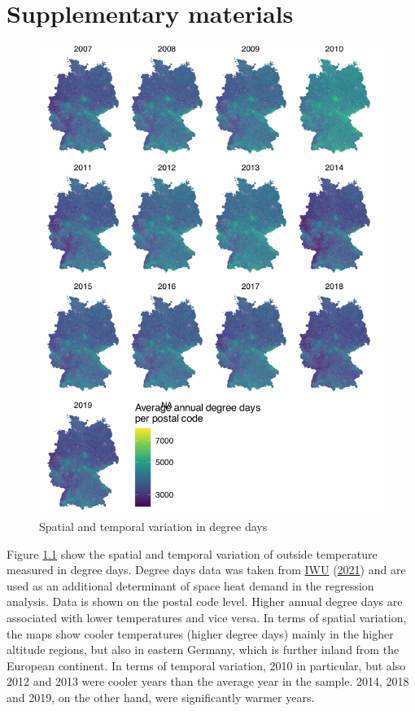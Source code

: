 \documentclass[12pt,twoside]{reedthesis}
\begin{document}
\appendix

\hypertarget{supplementary-materials}{%
\chapter{Supplementary materials}\label{supplementary-materials}}

\singlespacing
\newpage
\begin{figure}

{\centering \includegraphics[width=0.77\linewidth]{figure/distribution_degree_days} 

}

\caption{Spatial and temporal variation in degree days}\label{fig:degree-days-distribution}
\end{figure}
\noindent
Figure \ref{fig:degree-days-distribution} show the spatial and temporal variation of outside temperature measured in degree days. Degree days data was taken from \protect\hyperlink{ref-iwu21}{IWU} (\protect\hyperlink{ref-iwu21}{2021}) and are used as an additional determinant of space heat demand in the regression analysis. Data is shown on the postal code level. Higher annual degree days are associated with lower temperatures and vice versa. In terms of spatial variation, the maps show cooler temperatures (higher degree days) mainly in the higher altitude regions, but also in eastern Germany, which is further inland from the European continent. In terms of temporal variation, 2010 in particular, but also 2012 and 2013 were cooler years than the average year in the sample. 2014, 2018 and 2019, on the other hand, were significantly warmer years.
\end{document}
